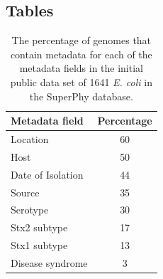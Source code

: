 \documentclass[doublespacing, linenumbers]{bmcart}
\begin{document}
\begin{backmatter}
\section*{Tables}
\begin{table}[h!]
\caption{The percentage of genomes that contain metadata for each of the metadata fields in the initial public data set of 1641 \textit{E. coli} in the SuperPhy database.}
\label{tab:metadata}
      \begin{tabular}{lc}
        \hline
        Metadata field & Percentage\\ 
        \hline
        Location & 60\\
        Host & 50\\
        Date of Isolation & 44\\
        Source & 35\\
        Serotype & 30\\
        Stx2 subtype & 17\\
        Stx1 subtype & 13\\
        Disease syndrome & 3\\ 
        \hline
      \end{tabular}
\end{table}


\end{backmatter}
\end{document}
